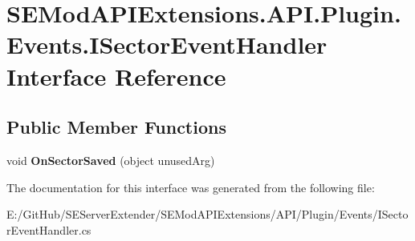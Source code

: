 \hypertarget{interface_s_e_mod_a_p_i_extensions_1_1_a_p_i_1_1_plugin_1_1_events_1_1_i_sector_event_handler}{}\section{S\+E\+Mod\+A\+P\+I\+Extensions.\+A\+P\+I.\+Plugin.\+Events.\+I\+Sector\+Event\+Handler Interface Reference}
\label{interface_s_e_mod_a_p_i_extensions_1_1_a_p_i_1_1_plugin_1_1_events_1_1_i_sector_event_handler}
\subsection*{Public Member Functions}
\begin{DoxyCompactItemize}
\item 
\hypertarget{interface_s_e_mod_a_p_i_extensions_1_1_a_p_i_1_1_plugin_1_1_events_1_1_i_sector_event_handler_a414c5f8764a466f7daf99af58f9751f0}{}void {\bfseries On\+Sector\+Saved} (object unused\+Arg)\label{interface_s_e_mod_a_p_i_extensions_1_1_a_p_i_1_1_plugin_1_1_events_1_1_i_sector_event_handler_a414c5f8764a466f7daf99af58f9751f0}

\end{DoxyCompactItemize}


The documentation for this interface was generated from the following file\+:\begin{DoxyCompactItemize}
\item 
E\+:/\+Git\+Hub/\+S\+E\+Server\+Extender/\+S\+E\+Mod\+A\+P\+I\+Extensions/\+A\+P\+I/\+Plugin/\+Events/I\+Sector\+Event\+Handler.\+cs\end{DoxyCompactItemize}
